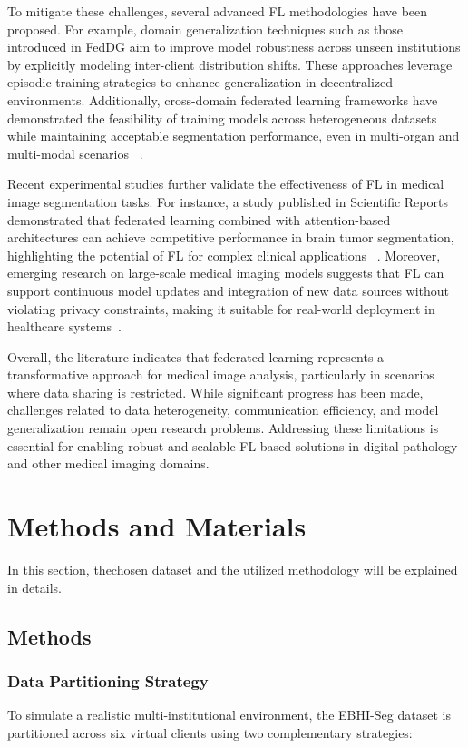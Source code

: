 \documentclass[conference]{IEEEtran}
\begin{document}
To mitigate these challenges, several advanced FL methodologies have been proposed. For example, domain generalization techniques such as those introduced in FedDG aim to improve model robustness across unseen institutions by explicitly modeling inter-client distribution shifts. These approaches leverage episodic training strategies to enhance generalization in decentralized environments. Additionally, cross-domain federated learning frameworks have demonstrated the feasibility of training models across heterogeneous datasets while maintaining acceptable segmentation performance, even in multi-organ and multi-modal scenarios ~\cite{LL5}.

Recent experimental studies further validate the effectiveness of FL in medical image segmentation tasks. For instance, a study published in Scientific Reports demonstrated that federated learning combined with attention-based architectures can achieve competitive performance in brain tumor segmentation, highlighting the potential of FL for complex clinical applications ~\cite{LL6}. Moreover, emerging research on large-scale medical imaging models suggests that FL can support continuous model updates and integration of new data sources without violating privacy constraints, making it suitable for real-world deployment in healthcare systems~\cite{LL7}.

Overall, the literature indicates that federated learning represents a transformative approach for medical image analysis, particularly in scenarios where data sharing is restricted. While significant progress has been made, challenges related to data heterogeneity, communication efficiency, and model generalization remain open research problems. Addressing these limitations is essential for enabling robust and scalable FL-based solutions in digital pathology and other medical imaging domains.


\section{Methods and Materials}
In this section, thechosen dataset and the utilized methodology will be explained in details.

\subsection{Methods}

\subsubsection{Data Partitioning Strategy}
To simulate a realistic multi-institutional environment, the EBHI-Seg dataset is partitioned across six virtual clients using two complementary strategies:
\end{document}
